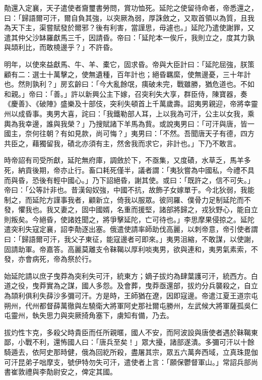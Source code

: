 \begin{pinyinscope}
 勣還入定襄，天子遣使者齎璽書勞問，賞功恤死。延陀之使留待命者，帝悉還之，曰：「歸語爾可汗，爾自負其強，以突厥為弱，厚誅斂之，又取首領以為質，且我為天下主，渠嘗賦發於爾邪？後有利害，當謹思，毋遽也。」延陀乃遣使謝罪，又遣其仲父沙缽羅獻馬三千，因請昏。帝曰：「延陀本一俟斤，我則立之，度其力孰與頡利比，而敢橈邊乎？」不許昏。



 明年，以使來益獻馬、牛、羊、橐它，固求昏。帝與大臣計曰：「延陀屈強，朕策顧有二：選士十萬擊之，使無遺種，百年計也；絕昏羈縻，使無邊憂，三十年計也。然則孰利？」房玄齡曰：「今大亂餘氓，痍破未完，戰雖勝，猶危道也。不如和親。」帝曰：「善。」許以新興公主下嫁，召突利失大享，群臣侍，陳寶器，奏《慶善》、《破陣》盛樂及十部伎，突利失頓首上千萬歲壽。詔夷男親迎，帝將幸靈州以成昏事。夷男大喜，詫曰：「我鐵勒部人耳，上以我為可汗，公主以女我，乘輿為我幸邊，誰與我榮？」乃搜賦諸下羊馬為貲。或說夷男曰：「可汗與唐，皆一國主，奈何往朝？有如見款，尚可悔？」夷男曰：「不然。吾聞唐天子有德，四方共臣之，藉獨留我，磧北亦須有主，然舍我而求它，非計也。」下乃不敢言。



 時帝詔有司受所獻，延陀無府庫，調斂於下，不亟集，又度磧，水草乏，馬羊多死，納貢後期，帝亦止行。畜口耗死僅半，議者謂：「夷狄嘗為中國私，今禮不具而與昏，恐後有輕中國心。」乃下詔絕昏，謝其使。或曰：「既許之，信不可失。」帝曰：「公等計非也。昔漢匈奴強，中國不抗，故飾子女嫁單于。今北狄弱，我能制之，而延陀方謹事我者，顧新立，倚我以服眾。彼同羅、僕骨力足制延陀而不發，懼我也。我又妻之，固中國婿，名重而援堅，諸部將歸之，戎狄野心，能自立則叛矣。今絕昏，使諸姓聞之，將爭擊延陀，亡可待也。」李思摩果侵掠之。延陀遣突利失寇定襄，詔李勣逐出塞。俄遣使請率師助伐高麗，以刺帝意，帝引使者謂曰：「歸語爾可汗，我父子東征，能寇邊者可即來。」夷男沮縮，不敢謀，以使謝，固請助軍。帝嘉答。高麗莫離支令靺鞨以厚利啖夷男，欲與連和，夷男氣素索，不發，亦會病死，帝為祭於行。



 始延陀請以庶子曳莽為突利失可汗，統東方；嫡子拔灼為肆葉護可汗，統西方。白道之役，曳莽實為之謀，國人多怨。及會葬，曳莽亟還部，拔灼分兵襲殺之，自立為頡利俱利失薛沙多彌可汗。方是時，王師猶在遼，因即寇邊。帝遣江夏王道宗屯朔州，代州都督薛萬徹與左驍衛大將軍阿史那社爾屯勝州，左武候大將軍薩孤吳仁屯靈州，執失思力與突厥掎角塞下，虜知有備，乃去。



 拔灼性卞克，多殺父時貴臣而任所親暱，國人不安，而阿波設與唐使者遇於靺鞨東鄙，小戰不利，還怖國人曰：「唐兵至矣！」眾大擾，諸部遂潰。多彌可汗以十餘騎遁去，依阿史那時健，俄為回紇所殺，盡屠其宗，眾五六萬奔西域，立真珠毘伽可汗昆弟子咄摩支，號伊特勿失可汗，遣使者上言：「願保鬱督軍山。」常詔兵部尚書崔敦禮與李勣尉安之，俾定其國。




\end{pinyinscope}
